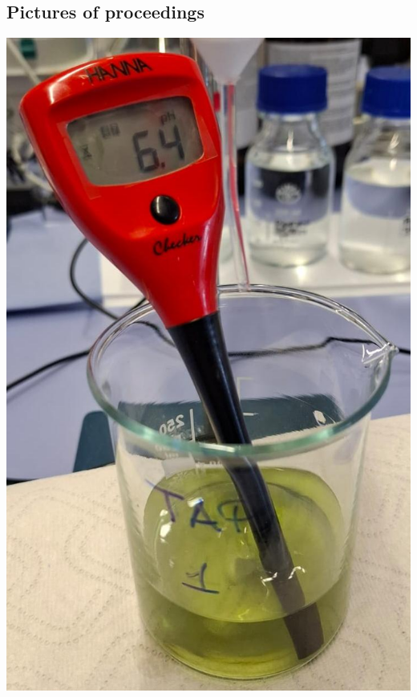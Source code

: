 \documentclass{article}
\begin{document}
\subsection{Pictures of proceedings}
\begin{minipage}[t]{\textwidth}
    \begin{minipage}[t]{0.29\textwidth}
        \centering
        \includegraphics[width=\textwidth]{media/ph-measuring.jpeg}
        \label{fig:ph_measuring}
    \end{minipage}
    \hfill
    \begin{minipage}[t]{0.36\textwidth}
        \centering

\end{minipage}
\end{minipage}
\end{document}
